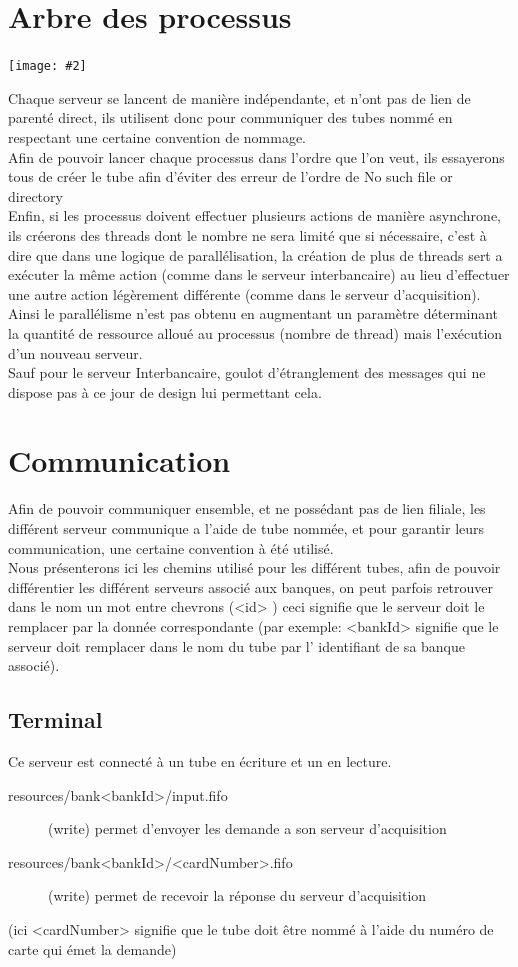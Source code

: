 \documentclass[french, a4paper, 12pt, titlepage]{article}
\newcommand{\graph}[2]{
\medskip
	\begin{center}
		\texttt{[image: \#2]}
	\end{center}
\medskip
}
\begin{document}
\section{Arbre des processus}
\graph{0.6}{arbre}
Chaque serveur se lancent de manière indépendante, et n'ont pas de lien de parenté direct, ils utilisent donc pour communiquer des tubes nommé en respectant une certaine convention de nommage.\\
\noindent
Afin de pouvoir lancer chaque processus dans l'ordre que l'on veut, ils essayerons tous de créer le tube afin d'éviter des erreur de l'ordre de \og No such file or directory \fg\\
\noindent
Enfin, si les processus doivent effectuer plusieurs actions de manière asynchrone, ils créerons des threads dont le nombre ne sera limité que si nécessaire,
c'est à dire que dans une logique de parallélisation, la création de plus de threads sert a exécuter la même action (comme dans le serveur interbancaire) au lieu d'effectuer une autre action légèrement différente (comme dans le serveur d'acquisition).\\
\noindent
Ainsi le parallélisme n'est pas obtenu en augmentant un paramètre déterminant la quantité de ressource alloué au processus (nombre de thread) mais l'exécution d'un nouveau serveur.\\
\noindent
Sauf pour le serveur Interbancaire, goulot d'étranglement des messages qui ne dispose pas à ce jour de design lui permettant cela.


\section{Communication}
Afin de pouvoir communiquer ensemble, et ne possédant pas de lien filiale, les différent serveur communique a l'aide de tube nommée, et pour garantir leurs communication, une certaine convention à été utilisé.\\
\noindent
Nous présenterons ici les chemins utilisé pour les différent tubes, afin de pouvoir différentier les différent serveurs associé aux banques, on peut parfois retrouver dans le nom un mot entre chevrons (\og <id> \fg) ceci signifie que le serveur doit le remplacer par la donnée correspondante (par exemple: <bankId> signifie que le serveur doit remplacer dans le nom du tube par l' identifiant de sa banque associé).

\subsection{Terminal}
Ce serveur est connecté à un tube en écriture et un en lecture.
\begin{description}
	\item[resources/bank<bankId>/input.fifo] (write) permet d'envoyer les demande a son serveur d'acquisition
	\item[resources/bank<bankId>/<cardNumber>.fifo] (write) permet de recevoir la réponse du serveur d'acquisition
\end{description}
\noindent
(ici <cardNumber> signifie que le tube doit être nommé à l'aide du numéro de carte qui émet la demande)
\end{document}
